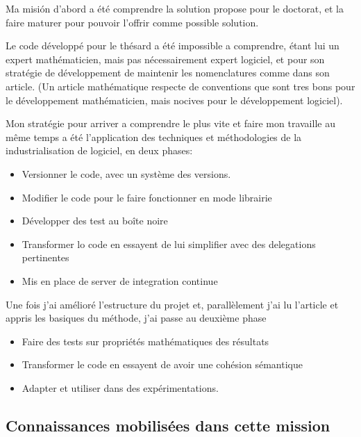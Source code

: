 \documentclass{resume} %
\begin{document}
		Ma misión d'abord a été comprendre la solution propose pour le doctorat, et la faire maturer pour pouvoir l'offrir comme possible solution.  
		
		Le code développé pour le thésard  a été impossible a comprendre, étant lui un expert mathématicien, mais pas nécessairement expert logiciel, et pour son stratégie  de développement de maintenir les nomenclatures comme dans son article. (Un article mathématique respecte de conventions que sont tres bons pour le développement mathématicien, mais nocives pour le développement logiciel). 
		
		Mon stratégie pour arriver a comprendre le plus vite et faire mon travaille au même temps a été l'application des techniques et méthodologies de la industrialisation de logiciel, en deux phases: 
		
		\begin{itemize}
				\item Versionner le code, avec un système des versions.
				\item Modifier le code pour le faire fonctionner en mode librairie 
				\item Développer des test au boîte noire
				\item Transformer lo code en essayent de lui simplifier avec des delegations pertinentes 
				\item Mis en place de server de integration continue
		\end {itemize}

		Une fois j'ai amélioré l'estructure du projet et, parallèlement j'ai lu l'article et appris les basiques du méthode, j'ai passe au deuxième phase 
	
		\begin{itemize}
				\item Faire des tests sur propriétés mathématiques des résultats   
				\item Transformer le code en essayent de avoir une cohésion sémantique 
				\item Adapter et utiliser dans des expérimentations.
		\end {itemize}

	
	\subsection {Connaissances mobilisées dans cette mission }
	
\end{document}
